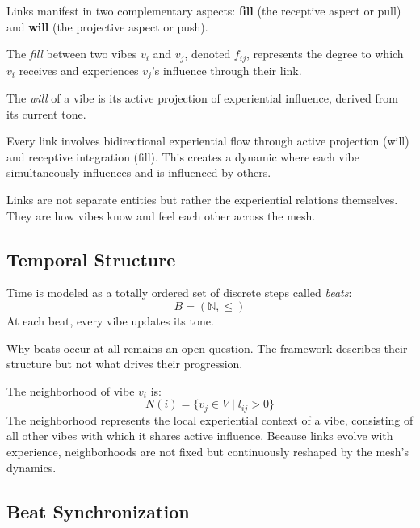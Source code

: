 Links manifest in two complementary aspects: \textbf{fill} (the receptive aspect or pull) and \textbf{will} (the projective aspect or push).

\begin{definition}[Fill]
The \emph{fill} between two vibes $v_i$ and $v_j$, denoted $f_{ij}$, represents the degree to which $v_i$ receives and experiences $v_j$'s influence through their link.
\end{definition}

\begin{definition}[Will]
The \emph{will} of a vibe is its active projection of experiential influence, derived from its current tone.
\end{definition}

\begin{proposition}
Every link involves bidirectional experiential flow through active projection (will) and receptive integration (fill). This creates a dynamic where each vibe simultaneously influences and is influenced by others.
\end{proposition}

Links are not separate entities but rather the experiential relations themselves. They are how vibes know and feel each other across the mesh.

\subsection{Temporal Structure}

\begin{definition}[Beat]
Time is modeled as a totally ordered set of discrete steps called \emph{beats}:
\[
B = (\mathbb{N}, \le)
\]
At each beat, every vibe updates its tone.
\end{definition}

Why beats occur at all remains an open question. The framework describes their structure but not what drives their progression.

\begin{definition}[Neighborhood]
The neighborhood of vibe $v_i$ is:
\[
N(i) = \{v_j \in V \mid l_{ij} > 0\}
\]
The neighborhood represents the local experiential context of a vibe, consisting of all other vibes with which it shares active influence. Because links evolve with experience, neighborhoods are not fixed but continuously reshaped by the mesh's dynamics.
\end{definition}

\subsection{Beat Synchronization}

